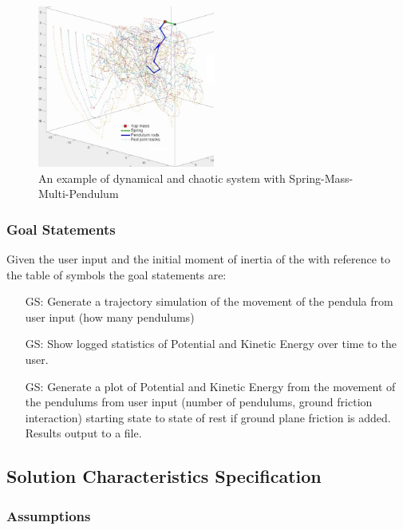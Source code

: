 \documentclass[12pt]{article}
\newcounter{goalnum} %
\begin{document}
\begin{figure}[h]
	\centering
	\includegraphics[width=220px]{multi-pend.jpg}
	\caption{An example of dynamical and chaotic system with
	Spring-Mass-Multi-Pendulum~\citep{MLSim}}
	\label{fig:multipend}
\end{figure}

\subsubsection{Goal Statements}

\noindent Given the user input and the initial moment of inertia of 
the \progname with reference to the table of symbols the goal statements are: 

\begin{itemize}
\item[GS\refstepcounter{goalnum}\thegoalnum:] Generate a trajectory
simulation of the movement of the pendula from user input (how many pendulums) 

\item[GS\refstepcounter{goalnum}\thegoalnum:] Show logged statistics of 
Potential and Kinetic Energy over time to the user. 

\item[GS\refstepcounter{goalnum}\thegoalnum:] Generate a plot of Potential
and Kinetic Energy from the movement of the pendulums from user input 
(number of pendulums, ground friction interaction) starting state to state of rest
if ground plane friction is added. Results output to a file.
\end{itemize}

\newpage

\subsection{Solution Characteristics Specification}

\subsubsection{Assumptions}
\end{document}
